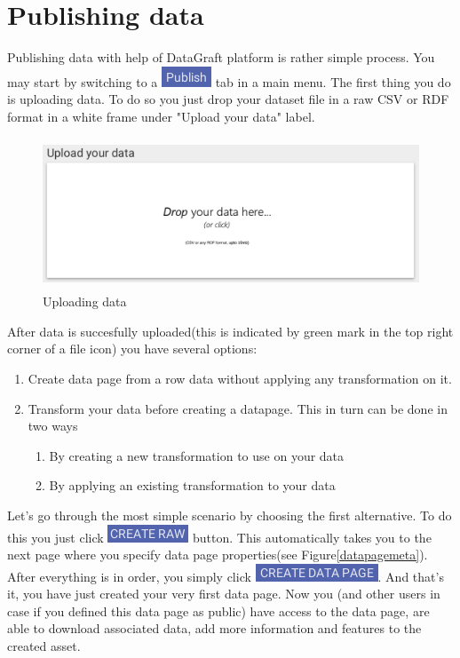 \documentclass[USenglish]{article}
\begin{document}
\section{Publishing data \label{publish}}
Publishing data with help of DataGraft platform is rather simple process. You may start by switching to a {\includegraphics[scale=0.8]{publish.png}} tab in a main menu. The first thing you do is uploading data. To do so you just drop your dataset file in a raw CSV or RDF format in a white frame under "Upload your data" label. 
\begin{center}
\begin{figure}[!htbp]
\centering
\includegraphics[height=4.5cm] {upload.png}
 \caption{Uploading data \label{meta}}
\end{figure}
\end{center}
After data is succesfully uploaded(this is indicated by green mark in the top right corner of a file icon) you have several options:
	\begin{enumerate}
	\item Create data page from a row data without applying any transformation on it.
	\item Transform your data before creating a datapage. This in turn can be done in two ways	
	\begin{enumerate}
	\item By creating a new transformation to use on your data
	\item By applying an existing transformation to your data
	\end{enumerate}
	\end{enumerate}
	
	
Let's go through the most simple scenario by choosing the first alternative. To do this you just click {\includegraphics[scale=0.8]{createraw.png}} button. This automatically takes you to the next page where you specify data page properties(see Figure\ref{datapagemeta}). After everything is in order, you simply click {\includegraphics[scale=0.8]{createdatapage.png}}. And that's it, you have just created your very first data page. Now you (and other users in case if you defined this data page as public) have access to the data page, are able to download associated data, add more information and features to the created asset.
\end{document}

